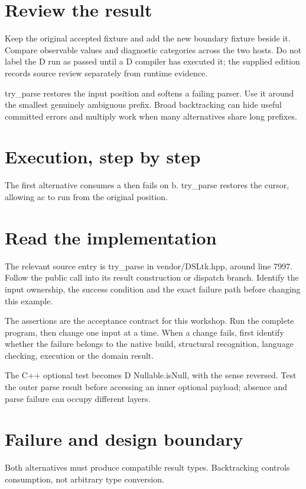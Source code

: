 \section*{Review the result}
Keep the original accepted fixture and add the new boundary fixture beside it. Compare observable values and diagnostic categories across the two hosts. Do not label the D run as passed until a D compiler has executed it; the supplied edition records source review separately from runtime evidence.

\clearpage
{}
try\_parse restores the input position and softens a failing parser. Use it around the smallest genuinely ambiguous prefix. Broad backtracking can hide useful committed errors and multiply work when many alternatives share long prefixes.


\section*{Execution, step by step}
The first alternative consumes a then fails on b. try\_parse restores the cursor, allowing ac to run from the original position.

\section*{Read the implementation}
The relevant source entry is try\_parse in vendor/DSLtk.hpp, around line 7997. Follow the public call into its result construction or dispatch branch. Identify the input ownership, the success condition and the exact failure path before changing this example.

The assertions are the acceptance contract for this workshop. Run the complete program, then change one input at a time. When a change fails, first identify whether the failure belongs to the native build, structural recognition, language checking, execution or the domain result.

\clearpage
{}
The C++ optional test becomes D Nullable.isNull, with the sense reversed. Test the outer parse result before accessing an inner optional payload; absence and parse failure can occupy different layers.


\section*{Failure and design boundary}
Both alternatives must produce compatible result types. Backtracking controls consumption, not arbitrary type conversion.

